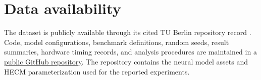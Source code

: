 \documentclass[review,nopreprintline]{elsarticle}
\newif\ifanonsubmission
\begin{document}
\section*{Data availability}
\ifanonsubmission
Repository links that identify the authors are omitted from the blinded fallback build and are provided in the author manuscript.
\else
The dataset is publicly available through its cited TU Berlin repository record \cite{LFP_DoE_Cycle_Aging_Dataset}. Code, model configurations, benchmark definitions, random seeds, result summaries, hardware timing records, and analysis procedures are maintained in a \href{https://github.com/FRzepka/1_SCRIPTS}{public GitHub repository}. The repository contains the neural model assets and HECM parameterization used for the reported experiments.
\fi



\end{document}
